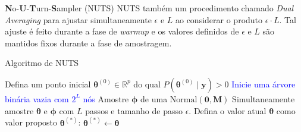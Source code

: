 \begin{frame}{\textbf{N}o-\textbf{U}-\textbf{T}urn-\textbf{S}ampler (NUTS)}
  NUTS também um procedimento chamado \textit{Dual Averaging}
  \parencite{nesterov2009primal} para ajustar simultaneamente $\epsilon$ e $L$ ao
  considerar o produto $\epsilon \cdot L$.
  \vfill
  Tal ajuste é feito durante a fase de \textit{warmup} e os valores definidos de
  $\epsilon$ e $L$ são mantidos fixos durante a fase de amostragem.
\end{frame}

\begin{frame}{Algoritmo de NUTS}
    \SetAlCapFnt{\footnotesize}
    \SetAlCapNameFnt{\footnotesize}
    \begin{algorithm}[H]
    \DontPrintSemicolon
    \SetAlgoNoEnd
    \SetAlgoLined
    \fontsize{4.5pt}{6.5pt}\selectfont
    Defina um ponto inicial $\boldsymbol{\theta}^{(0)} \in \mathbb{R}^p$ do qual $P\left(\boldsymbol{\theta}^{(0)} \mid \boldsymbol{y} \right) > 0$\;
    \textcolor{blue}{Inicie uma árvore binária vazia com $2^L$ nós}\;
    Amostre $\boldsymbol{\phi}$ de uma $\text{Normal}(\mathbf{0},\mathbf{M})$\;
    Simultaneamente amostre $\boldsymbol{\theta}$ e $\boldsymbol{\phi}$ com $L$ passos e tamanho de passo $\epsilon$.\;
    Defina o valor atual $\boldsymbol{\theta}$ como valor proposto $\boldsymbol{\theta}^{(*)}$:
    $\boldsymbol{\theta}^{(*)} \leftarrow \boldsymbol{\theta}$\;
\end{algorithm}
\end{frame}
